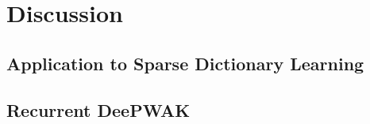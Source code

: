 \section{Discussion}

\subsection{Application to Sparse Dictionary Learning}

\subsection{Recurrent DeePWAK}
